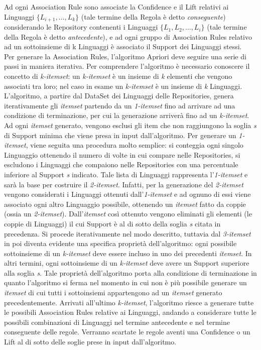 Ad ogni Association Rule sono associate la Confidence e il Lift relativi ai Linguaggi $\{L_{i+1}, \dots, L_k\}$ (tale termine della Regola è detto \emph{conseguente}) considerando le Repository contenenti i Linguaggi $\{L_1, L_2, \dots, L_i\}$ (tale termine della Regola è detto \emph{antecedente}), e ad ogni gruppo di Association Rules relativo ad un sottoinsieme di k Linguaggi è associato il Support dei Linguaggi stessi.\\
Per generare la Association Rules, l'algoritmo Apriori deve seguire una serie di passi in maniera iterativa. Per comprendere l'algoritmo è necessario conoscere il concetto di \emph{k-itemset}: un \emph{k-itemset} è un insieme di \emph{k} elementi che vengono associati tra loro; nel caso in esame un \emph{k-itemset} è un insieme di \emph{k} Linguaggi. L'algoritmo, a partire dal DataSet dei Linguaggi delle Repositories, genera iterativamente gli \emph{itemset} partendo da un \emph{1-itemset} fino ad arrivare ad una condizione di terminazione, per cui la generazione arriverà fino ad un \emph{k-itemset}. Ad ogni \emph{itemset} generato, vengono esclusi gli item che non raggiungono la soglia \emph{s} di Support minima che viene presa in input dall'algoritmo. Per generare un \emph{1-itemset}, viene seguita una procedura molto semplice: si conteggia ogni singolo Linguaggio ottenendo il numero di volte in cui compare nelle Repositories, si escludono i Linguaggi che compaiono nelle Repositories con una percentuale inferiore al Support \emph{s} indicato. Tale lista di Linguaggi rappresenta l'\emph{1-itemset} e sarà la base per costruire il \emph{2-itemset}. Infatti, per la generazione del \emph{2-itemset} vengono considerati i Linguaggi ottenuti dall'\emph{1-itemset} e ad ognuno di essi viene associato ogni altro Linguaggio possibile, ottenendo un \emph{itemset} fatto da coppie (ossia un \emph{2-itemset}). Dall'\emph{itemset} così ottenuto vengono eliminati gli elementi (le coppie di Linguaggi) il cui Support è al di sotto della soglia \emph{s} citata in precedenza. Si procede iterativamente nel modo descritto, tuttavia dal \emph{3-itemset} in poi diventa evidente una specifica proprietà dell'algoritmo: ogni possibile sottoinsieme di un \emph{k-itemset} deve essere incluso in uno dei precedenti \emph{itemset}. In altri termini, ogni sottoinsieme di un \emph{k-itemset} deve avere un Support superiore alla soglia \emph{s}. Tale proprietà dell'algoritmo porta alla condizione di terminazione in quanto l'algoritmo si ferma nel momento in cui non è più possibile generare un \emph{itemset} di cui tutti i sottoinsiemi appartengono ad un \emph{itemset} generato precedentemente. Arrivati all'ultimo \emph{k-itemset}, l'algoritmo riesce a generare tutte le possibili Association Rules relative ai Linguaggi, andando a considerare tutte le possibili combinazioni di Linguaggi nel termine antecedente e nel termine conseguente delle regole. Verranno scartate le regole aventi una Confidence o un Lift al di sotto delle soglie prese in input dall'algoritmo.\\
